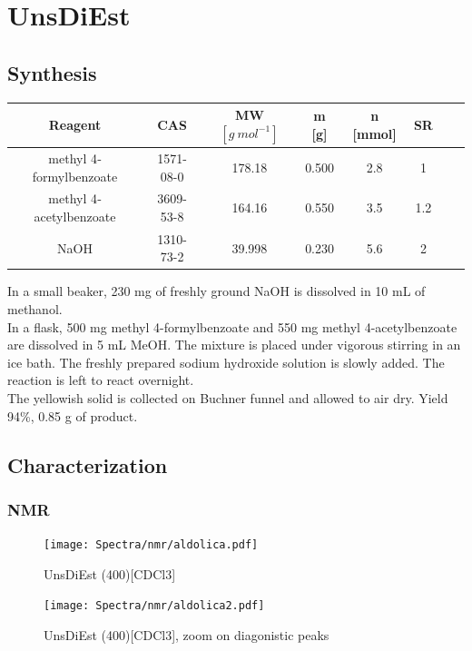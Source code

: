 \documentclass[../Master.tex]{subfiles}
\begin{document}
\section{UnsDiEst}
\subsection{Synthesis}
\begin{center}
	\begin{tabular}[b]{cccccccc}
		\toprule
		Reagent                 & CAS       & MW \([g \ mol^{-1}]\) & m [g] & n [mmol] & SR  \\
		\midrule
		methyl 4‐formylbenzoate & 1571-08-0 & 178.18                & 0.500 & 2.8      & 1   \\
		methyl 4‐acetylbenzoate & 3609-53-8 & 164.16                & 0.550 & 3.5      & 1.2 \\
		NaOH                    & 1310-73-2 & 39.998                & 0.230 & 5.6      & 2   \\
		\bottomrule
	\end{tabular}
\end{center}

In a small beaker, 230 mg of freshly ground NaOH is dissolved in 10 mL of methanol. \\
In a flask, 500 mg methyl 4-formylbenzoate and 550 mg methyl 4-acetylbenzoate are dissolved in 5 mL MeOH. The mixture is placed under vigorous stirring in an ice bath. The freshly prepared sodium hydroxide solution is slowly added. The reaction is left to react overnight. \\
The yellowish solid is collected on Buchner funnel and allowed to air dry. Yield 94\%, 0.85 g of product.
\newpage
\subsection{Characterization}
\subsubsection{NMR}

\begin{figure}[h!]
	\centering
	\texttt{[image: Spectra/nmr/aldolica.pdf]}
	\caption{UnsDiEst (400)[CDCl3]}
\end{figure}

\begin{figure}[h!]
	\centering
	\texttt{[image: Spectra/nmr/aldolica2.pdf]}
	\caption{UnsDiEst (400)[CDCl3], zoom on diagonistic peaks}
\end{figure}
\end{document}
